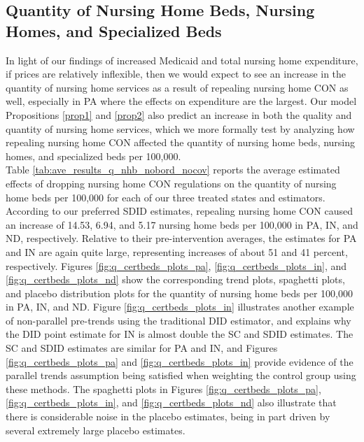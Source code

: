 \documentclass[../Main.tex]{subfiles}
\begin{document}
\subsection{Quantity of Nursing Home Beds, Nursing Homes, and Specialized Beds}

\indent In light of our findings of increased Medicaid and total nursing home expenditure, if prices are relatively inflexible, then we would expect to see an increase in the quantity of nursing home services as a result of repealing nursing home CON as well, especially in PA where the effects on expenditure are the largest. Our model Propositions \ref{prop1} and \ref{prop2} also predict an increase in both the quality and quantity of nursing home services, which we more formally test by analyzing how repealing nursing home CON affected the quantity of nursing home beds, nursing homes, and specialized beds per 100,000.\\
\indent Table \ref{tab:ave_results_q_nhb_nobord_nocov} reports the average estimated effects of dropping nursing home CON regulations on the quantity of nursing home beds per 100,000 for each of our three treated states and estimators. According to our preferred SDID estimates, repealing nursing home CON caused an increase of 14.53, 6.94, and 5.17 nursing home beds per 100,000 in PA, IN, and ND, respectively. Relative to their pre-intervention averages, the estimates for PA and IN are again quite large, representing increases of about 51 and 41 percent, respectively. Figures \ref{fig:q_certbeds_plots_pa}, \ref{fig:q_certbeds_plots_in}, and \ref{fig:q_certbeds_plots_nd} show the corresponding trend plots, spaghetti plots, and placebo distribution plots for the quantity of nursing home beds per 100,000 in PA, IN, and ND. Figure \ref{fig:q_certbeds_plots_in} illustrates another example of non-parallel pre-trends using the traditional DID estimator, and explains why the DID point estimate for IN is almost double the SC and SDID estimates. The SC and SDID estimates are similar for PA and IN, and Figures \ref{fig:q_certbeds_plots_pa} and \ref{fig:q_certbeds_plots_in} provide evidence of the parallel trends assumption being satisfied when weighting the control group using these methods. The spaghetti plots in Figures \ref{fig:q_certbeds_plots_pa}, \ref{fig:q_certbeds_plots_in}, and \ref{fig:q_certbeds_plots_nd} also illustrate that there is considerable noise in the placebo estimates, being in part driven by several extremely large placebo estimates.\\
\end{document}
